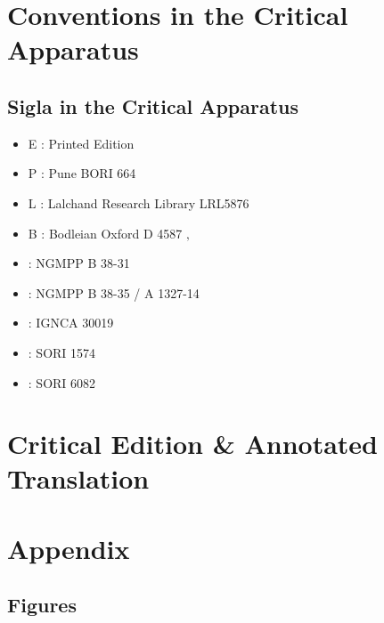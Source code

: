 \mainmatter

\chapter{Conventions in the Critical Apparatus}
\section{Sigla in the Critical Apparatus}

\begin{itemize}
\item E : Printed Edition
\item P : Pune BORI 664
\item L : Lalchand Research Library LRL5876
\item B : Bodleian Oxford D 4587
‚\item \None : NGMPP B 38-31
\item \Ntwo : NGMPP B 38-35 / A 1327-14
\item \Done : IGNCA 30019
\item \Uone : SORI 1574
\item \Utwo : SORI 6082
\end{itemize}

\chapter{Critical Edition \& Annotated Translation}
\cleardoublepage

\cleardoublepage
{}
\chapter{Appendix}
\section{Figures}

